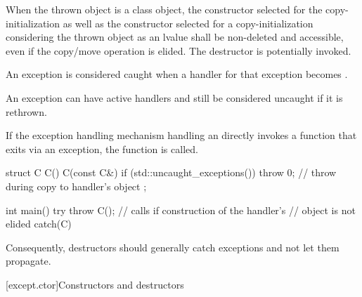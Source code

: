 \pnum
{}%
%
When the thrown object is a class object, the constructor selected for
the copy-initialization as well as the constructor selected for
a copy-initialization considering the thrown object as an lvalue
shall be non-deleted and accessible, even if the copy/move operation is
elided.
The destructor is potentially invoked.

\pnum
{}%
%
An exception is considered caught when a handler for that exception
becomes .
\begin{note}
An exception can have active handlers and still be considered uncaught if
it is rethrown.
\end{note}

\pnum
{}%
%
If the exception handling mechanism
handling an 
directly invokes a function that exits via an
exception, the function  is called.
\begin{example}
\begin{codeblock}
struct C {
  C() { }
  C(const C&) {
    if (std::uncaught_exceptions()) {
      throw 0;      // throw during copy to handler's  object
    }
  }
};

int main() {
  try {
    throw C();      // calls  if construction of the handler's
                    //  object is not elided
  } catch(C) { }
}
\end{codeblock}
\end{example}
\begin{note}
\setlength{\emergencystretch}{1em}
Consequently, destructors should generally catch exceptions and not let them propa\-gate.
\end{note}


[except.ctor]{Constructors and destructors}%
%
%

